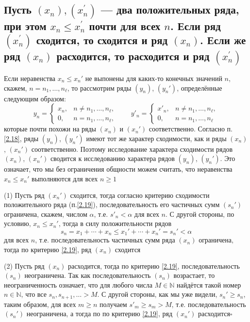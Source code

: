 \documentclass[a4paper]{article}
\newcommand{\qed}{\hfill$\square$}
\begin{document}
\subsection{Пусть $\left(x_{n}\right),\left(x_{n}^{\prime}\right)$ — два положительных ряда, при этом $x_{n} \leq x_{n}^{\prime}$ почти для всех $n$. Если ряд $\left(x_{n}^{\prime}\right)$ сходится, то сходится и ряд $\left(x_{n}\right)$. Если же ряд $\left(x_{n}\right)$ расходится, то расходится и ряд $\left(x_{n}^{\prime}\right)$}
Если неравенства $x_n\le x_n'$ не выпонены для каких-то конечных значений $n$, скажем, $n = n_1,\ldots, n_\ell$, то рассмотрим ряды $(y_n)$, $(y_n')$, определённые следующим образом:
$$
y_n = \begin{cases}
x_n, & n \ne n_1,\ldots, n_\ell,\\
0, & n = n_1,\ldots, n_\ell,
\end{cases} \qquad  y'_n = \begin{cases}
x'_n, & n \ne n_1,\ldots, n_\ell,\\
0, & n = n_1,\ldots, n_\ell
\end{cases} 
$$
которые почти похожи на ряды $(x_n)$ и $(x_n')$ соответственно. Согласно п. \ref{2.18}, ряды $(y_n)$, $(y_n')$ имеют тот же характер сходимости, как и ряды $(x_n)$, $(x_n')$ соответственно. Поэтому исследование характера сходимости рядов $(x_n)$, $(x_n')$ сводится к исследованию характера рядов $(y_n)$, $(y_n')$. Это означает, что мы без ограничения общности можем считать, что неравенства $x_n \le x_n'$ выполняются для всех $n\ge 1$

(1) Пусть ряд $(x_n')$ сходится, тогда согласно критерию сходимости положительного ряда (п.\ref{2.19}), последовательность его частичных сумм $(s_n')$ ограничена, скажем, числом $\alpha$, т.е. $s'_n < \alpha$ для всех $n.$ С другой стороны, по условию, $x_n \le x_n'$, тогда в силу положительности рядов
$$
s_n = x_1 + \cdots + x_n \le x_1' + \cdots + x_n' = s_n' < \alpha
$$
для всех $n$, т.е. последовательность частичных сумм ряда $(x_n)$ ограничена, тогда по критерию \ref{2.19}, ряд $(x_n)$ сходится

(2) Пусть ряд $(x_n)$ расходится, тогда по критерию \ref{2.19}, последовательность $(s_n)$ неограничена. Так как последовательность $(s_n)$ возрастает, то неограниченность означает, что для любого числа $M \in \mathbb{N}$ найдётся такой номер $n\in \mathbb{N}$, что все $s_n, s_{n+1}, \ldots > M$. С другой стороны, как мы уже видели, $s_n' \ge s_n$, таким образом, для всех $m \ge n$ получаем $s'_m \ge s_m > M$, т.е. последовательность $(s_n')$ неограничена, а тогда по по критерию \ref{2.19}, ряд $(x_n')$ расходится\qed
\end{document}
